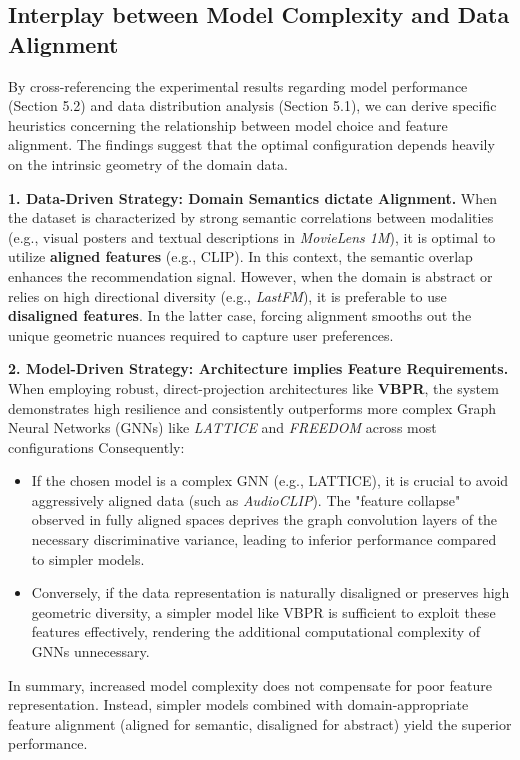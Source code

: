 \subsection{Interplay between Model Complexity and Data Alignment}

By cross-referencing the experimental results regarding model performance (Section 5.2) and data distribution analysis (Section 5.1), we can derive specific heuristics concerning the relationship between model choice and feature alignment. The findings suggest that the optimal configuration depends heavily on the intrinsic geometry of the domain data.

\textbf{1. Data-Driven Strategy: Domain Semantics dictate Alignment.}
When the dataset is characterized by strong semantic correlations between modalities (e.g., visual posters and textual descriptions in \textit{MovieLens 1M}), it is optimal to utilize \textbf{aligned features} (e.g., CLIP). In this context, the semantic overlap enhances the recommendation signal. However, when the domain is abstract or relies on high directional diversity (e.g., \textit{LastFM}), it is preferable to use \textbf{disaligned features}. In the latter case, forcing alignment smooths out the unique geometric nuances required to capture user preferences.

\textbf{2. Model-Driven Strategy: Architecture implies Feature Requirements.}
When employing robust, direct-projection architectures like \textbf{VBPR}, the system demonstrates high resilience and consistently outperforms more complex Graph Neural Networks (GNNs) like \textit{LATTICE} and \textit{FREEDOM} across most configurations Consequently:
\begin{itemize}
    \item If the chosen model is a complex GNN (e.g., LATTICE), it is crucial to avoid aggressively aligned data (such as \textit{AudioCLIP}). The "feature collapse" observed in fully aligned spaces deprives the graph convolution layers of the necessary discriminative variance, leading to inferior performance compared to simpler models.
    \item Conversely, if the data representation is naturally disaligned or preserves high geometric diversity, a simpler model like VBPR is sufficient to exploit these features effectively, rendering the additional computational complexity of GNNs unnecessary.
\end{itemize}

In summary, increased model complexity does not compensate for poor feature representation. Instead, simpler models combined with domain-appropriate feature alignment (aligned for semantic, disaligned for abstract) yield the superior performance.

